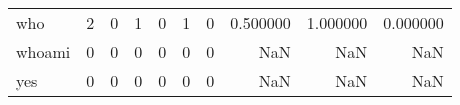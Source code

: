 \begin{longtable}{lrrrrrrrrr}
who       &                                                  2 &                                                  0 &                                                  1 &                                                  0 &                                                  1 &                                                  0 &                                           0.500000 &                               1.000000 &                             0.000000 \\
whoami    &                                                  0 &                                                  0 &                                                  0 &                                                  0 &                                                  0 &                                                  0 &                                                NaN &                                    NaN &                                  NaN \\
yes       &                                                  0 &                                                  0 &                                                  0 &                                                  0 &                                                  0 &                                                  0 &                                                NaN &                                    NaN &                                  NaN \\
\end{longtable}
